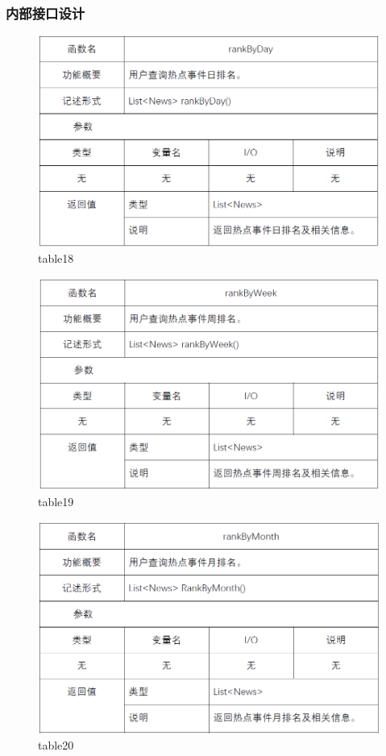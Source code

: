 \subsubsection{内部接口设计}
\begin{figure}[!htb]
	\centering
	\includegraphics[scale=1]{image/b18.png} %
	\caption{table18} %
\end{figure}
\begin{figure}[!htb]
	\centering
	\includegraphics[scale=1]{image/b19.png} %
	\caption{table19} %
\end{figure}
\begin{figure}[!htb]
	\centering
	\includegraphics[scale=1]{image/b20.png} %
	\caption{table20} %
\end{figure}
